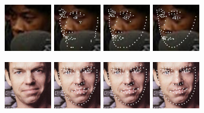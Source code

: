 \documentclass[journal,transmag]{IEEEtran}
\begin{document}
\begin{figure}[tbh]
   \includegraphics[width=2.1cm]{visualization_imgs/raw_images/WFLW_test_1271.jpg}
   \includegraphics[width=2.1cm]{visualization_imgs/hrnet_pred_images/pred_1271.jpg}
   \includegraphics[width=2.1cm]{visualization_imgs/ATF_pred_images/pred_1271.jpg}
   \includegraphics[width=2.1cm]{visualization_imgs/gt_images/WFLW_test_1271.jpg}
   
   \includegraphics[width=2.1cm]{visualization_imgs/raw_images/WFLW_test_1087.jpg}
   \includegraphics[width=2.1cm]{visualization_imgs/hrnet_pred_images/pred_1087.jpg}
   \includegraphics[width=2.1cm]{visualization_imgs/ATF_pred_images/pred_1087.jpg}
   \includegraphics[width=2.1cm]{visualization_imgs/gt_images/WFLW_test_1087.jpg}


\end{figure}
\end{document}
